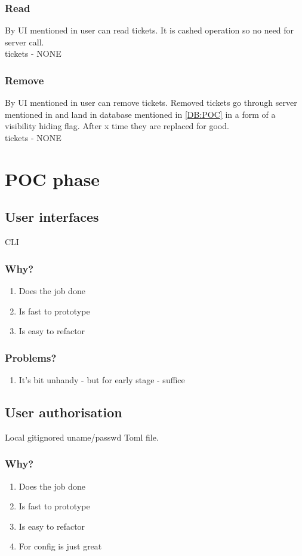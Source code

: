 \subsubsection{Read}
By UI mentioned in  user can read tickets. It is cashed operation so no need for server call.\\
tickets - NONE
\subsubsection{Remove}
By UI mentioned in  user can remove tickets. Removed tickets go through server mentioned in  and land in database mentioned in \ref{DB:POC} in a form of a visibility hiding flag. After x time they are replaced for good.\\
tickets - NONE



\newpage
\section{POC phase}
\subsection{User interfaces}\label{UI:POC}
CLI
\subsubsection{Why?}
\begin{enumerate}
    \item Does the job done
    \item Is fast to prototype
    \item Is easy to refactor
\end{enumerate}
\subsubsection{Problems?}
\begin{enumerate}
    \item It's bit unhandy - but for early stage - suffice
\end{enumerate}

\subsection{User authorisation}\label{AUTH:POC}
Local gitignored uname/passwd Toml file.
\subsubsection{Why?}
\begin{enumerate}
    \item Does the job done
    \item Is fast to prototype
    \item Is easy to refactor
    \item For config is just great
\end{enumerate}
